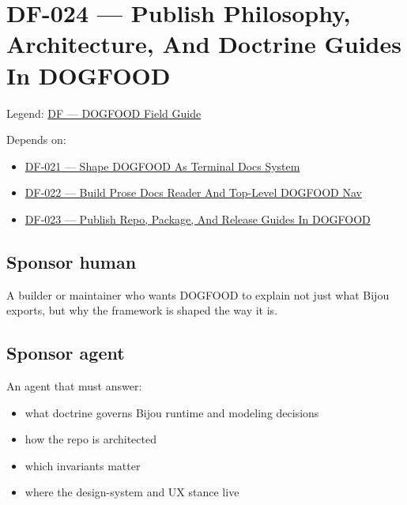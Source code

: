 \chapter{DF-024 --- Publish Philosophy, Architecture, And Doctrine Guides In DOGFOOD}\label{record-085}

\smallskip

Legend: \href{https://github.com/flyingrobots/bijou/blob/1853ad902f6bf219326409e7f743a5a1d6517dbc/docs/legends/DF-dogfood-field-guide.md}{DF --- DOGFOOD Field Guide}

Depends on:

\begin{itemize}
\tightlist
\item
  \href{https://github.com/flyingrobots/bijou/blob/cbd70612140e7a450d764b3c7be1c6af878b99bc/docs/design/DF-021-shape-dogfood-as-terminal-docs-system.md}{DF-021 --- Shape DOGFOOD As Terminal Docs System}
\item
  \href{https://github.com/flyingrobots/bijou/blob/cbd70612140e7a450d764b3c7be1c6af878b99bc/docs/design/DF-022-build-prose-docs-reader-and-top-level-dogfood-nav.md}{DF-022 --- Build Prose Docs Reader And Top-Level DOGFOOD Nav}
\item
  \href{https://github.com/flyingrobots/bijou/blob/cbd70612140e7a450d764b3c7be1c6af878b99bc/docs/design/DF-023-publish-repo-package-and-release-guides-in-dogfood.md}{DF-023 --- Publish Repo, Package, And Release Guides In DOGFOOD}
\end{itemize}

\section{Sponsor human}\label{record-085-sponsor-human}

A builder or maintainer who wants DOGFOOD to explain not just what Bijou exports, but why the framework is shaped the way it is.

\section{Sponsor agent}\label{record-085-sponsor-agent}

An agent that must answer:

\begin{itemize}
\tightlist
\item
  what doctrine governs Bijou runtime and modeling decisions
\item
  how the repo is architected
\item
  which invariants matter
\item
  where the design-system and UX stance live
\end{itemize}

